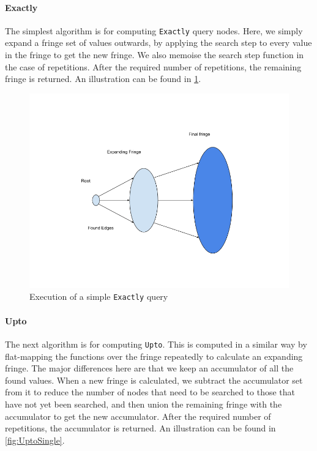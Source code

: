 \documentclass[12pt,a4paper,twoside,openright]{report}
\newcommand\codeName[1]{\texttt{#1}}
\begin{document}
		\paragraph{Exactly}
The simplest algorithm is for computing \codeName{Exactly} query nodes. Here, we simply expand a fringe set of values outwards, by applying the search step to every value in the fringe to get the new fringe. We also memoise the search step function in the case of repetitions. After the required number of repetitions, the remaining fringe is returned. An illustration can be found in \ref{fig:ExactlySingle}.

\begin{figure}[ht]
\centering
  \includegraphics[width=\textwidth]{figs/Exactly.png}
  \caption{Execution of a simple \codeName{Exactly} query}
  \label{fig:ExactlySingle}
\end{figure}
    		\paragraph{Upto}
The next algorithm is for computing \codeName{Upto}. This is computed in a similar way by flat-mapping the functions over the fringe repeatedly to calculate an expanding fringe. The major differences here are that we keep an accumulator of all the found values. When a new fringe is calculated, we subtract the accumulator set from it to reduce the number of nodes that need to be searched to those that have not yet been searched, and then union the remaining fringe with the accumulator to get the new accumulator. After the required number of repetitions, the accumulator is returned. An illustration can be found in \ref{fig:UptoSingle}.
\end{document}
